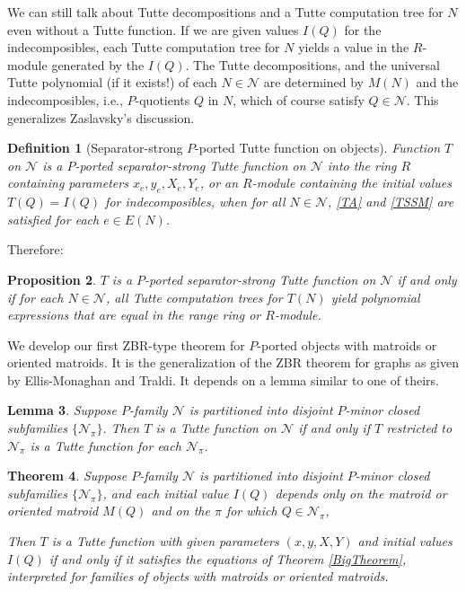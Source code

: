 \documentclass[12pt,leqno]{amsart}
\newtheorem{lem}{Lemma}
\newtheorem{prop}[lem]{Proposition}
\newtheorem{thm}[lem]{Theorem}
\newtheorem{definition}[lem]{Definition}
\theoremstyle{remark}
\begin{document}
We can still talk about Tutte decompositions and a
Tutte computation tree for $N$ even  without 
a Tutte function.  If we are given values $I(Q)$
for the indecomposibles, each Tutte computation tree 
for $N$ yields a value in the $R$-module generated by
the $I(Q)$.
The Tutte decompositions, and the universal
Tutte polynomial (if it exists!)
of each $N\in \mathcal{N}$
are determined by $M(N)$ and the indecomposibles, i.e., $P$-quotients
$Q$ in $N$, which of course satisfy $Q \in \mathcal{N}$.
This generalizes Zaslavsky's discussion\cite{MR93a:05047}.

\begin{definition}[Separator-strong $P$-ported Tutte function on objects]

Function
$T$ on $\mathcal{N}$
is a $P$-ported separator-strong Tutte function
on $\mathcal{N}$ into 
the ring $R$ 
containing parameters $x_e, y_e, X_e, Y_e$,
or an $R$-module containing the initial values
$T(Q)=I(Q)$ for indecomposibles,
when for all $N\in\mathcal{N}$,
\eqref{TA} and \eqref{TSSM} are
satisfied for each
$e\in E(N)$.
\end{definition}

Therefore:

\begin{prop}
$T$ is a $P$-ported separator-strong Tutte function
on $\mathcal{N}$ if and only if for each $N\in\mathcal{N}$,
all Tutte computation trees for $T(N)$ yield polynomial expressions
that are equal in the range ring or $R$-module.
\end{prop}

We develop our first ZBR-type theorem for $P$-ported objects
with matroids or oriented matroids.  It is the
generalization of the ZBR theorem for graphs as given
by Ellis-Monaghan and Traldi\cite{Ellis-Monaghan-Traldi}.  
It depends on a lemma similar to one of theirs.


\begin{lem}
\label{DisjSubclassLem}
Suppose $P$-family $\mathcal{N}$ is partitioned into
disjoint $P$-minor closed subfamilies $\{\mathcal{N}_{\pi}\}$.
Then $T$ is a Tutte function on $\mathcal{N}$ if and
only if $T$ restricted to $\mathcal{N}_{\pi}$ is
a Tutte function for each $\mathcal{N}_{\pi}$.
\end{lem}

\begin{thm}
\label{ZBRWildFamily}
Suppose $P$-family $\mathcal{N}$ is partitioned into
disjoint $P$-minor closed subfamilies $\{\mathcal{N}_{\pi}\}$,
and each initial value $I(Q)$ depends only on
the matroid or oriented matroid $M(Q)$ and on the
$\pi$ for which $Q\in\mathcal{N}_{\pi}$,

Then $T$ is a Tutte function with given parameters $(x,y,X,Y)$
and initial values $I(Q)$ if and only if it satisfies
the equations of Theorem \ref{BigTheorem}, interpreted
for families of objects with matroids or oriented matroids.
\end{thm}
\end{document}
